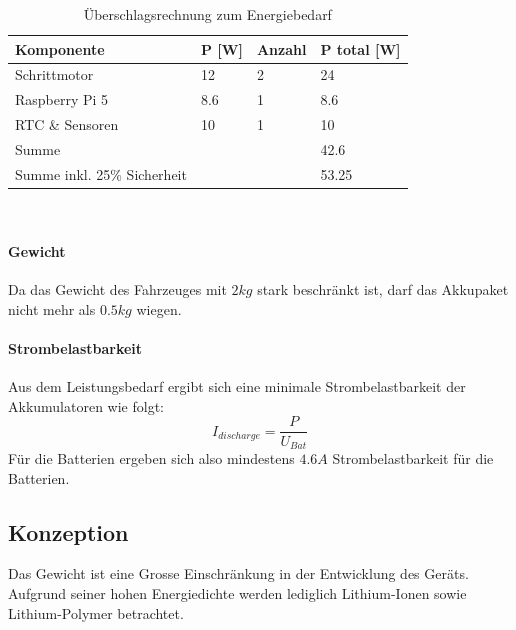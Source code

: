 \documentclass[main.tex]{subfiles} %
\begin{document}
\begin{table}[h!]
    \centering
    \begin{tabular}{|l|l|l|l|}
        \hline
        \textbf{Komponente}         & \textbf{P [W]} & \textbf{Anzahl} & \textbf{P total [W]} \\ \hline
        Schrittmotor                & 12             & 2               & 24                   \\ \hline
        Raspberry Pi 5              & 8.6            & 1               & 8.6                  \\ \hline
        RTC \& Sensoren             & 10             & 1               & 10                   \\ \hline
        Summe                       &                &                 & 42.6                 \\ \hline
        Summe inkl. 25\% Sicherheit &                &                 & 53.25                \\ \hline
    \end{tabular}
    \caption{Überschlagsrechnung zum Energiebedarf}~\label{tab:Energiebedarf_Akku}
\end{table}

\paragraph{Gewicht} Da das Gewicht des Fahrzeuges mit $2 kg$ stark beschränkt ist, darf das
Akkupaket nicht mehr als $ 0.5 kg$ wiegen.

\paragraph{Strombelastbarkeit}
Aus dem Leistungsbedarf ergibt sich eine minimale Strombelastbarkeit der
Akkumulatoren wie folgt:
\[
    I_{discharge} = \frac{P}{U_{Bat}}
\]
Für die Batterien ergeben sich also mindestens $4.6 A$ Strombelastbarkeit für
die Batterien.

\subsection*{Konzeption}

Das Gewicht ist eine Grosse Einschränkung in der Entwicklung des Geräts.
Aufgrund seiner hohen Energiedichte werden lediglich Lithium-Ionen sowie
Lithium-Polymer betrachtet.

\end{document}
